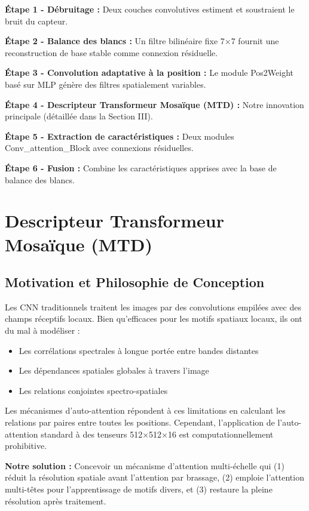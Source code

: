 \documentclass[conference]{IEEEtran}
\begin{document}
\textbf{Étape 1 - Débruitage :} Deux couches convolutives estiment et soustraient le bruit du capteur.

\textbf{Étape 2 - Balance des blancs :} Un filtre bilinéaire fixe 7×7 fournit une reconstruction de base stable comme connexion résiduelle.

\textbf{Étape 3 - Convolution adaptative à la position :} Le module Pos2Weight basé sur MLP génère des filtres spatialement variables.

\textbf{Étape 4 - Descripteur Transformeur Mosaïque (MTD) :} Notre innovation principale (détaillée dans la Section III).

\textbf{Étape 5 - Extraction de caractéristiques :} Deux modules Conv\_attention\_Block avec connexions résiduelles.

\textbf{Étape 6 - Fusion :} Combine les caractéristiques apprises avec la base de balance des blancs.

\section{Descripteur Transformeur Mosaïque (MTD)}

\subsection{Motivation et Philosophie de Conception}

Les CNN traditionnels traitent les images par des convolutions empilées avec des champs réceptifs locaux. Bien qu'efficaces pour les motifs spatiaux locaux, ils ont du mal à modéliser :
\begin{itemize}
    \item Les corrélations spectrales à longue portée entre bandes distantes
    \item Les dépendances spatiales globales à travers l'image
    \item Les relations conjointes spectro-spatiales
\end{itemize}

Les mécanismes d'auto-attention répondent à ces limitations en calculant les relations par paires entre toutes les positions. Cependant, l'application de l'auto-attention standard à des tenseurs 512×512×16 est computationnellement prohibitive.

\textbf{Notre solution :} Concevoir un mécanisme d'attention multi-échelle qui (1) réduit la résolution spatiale avant l'attention par brassage, (2) emploie l'attention multi-têtes pour l'apprentissage de motifs divers, et (3) restaure la pleine résolution après traitement.
\end{document}
